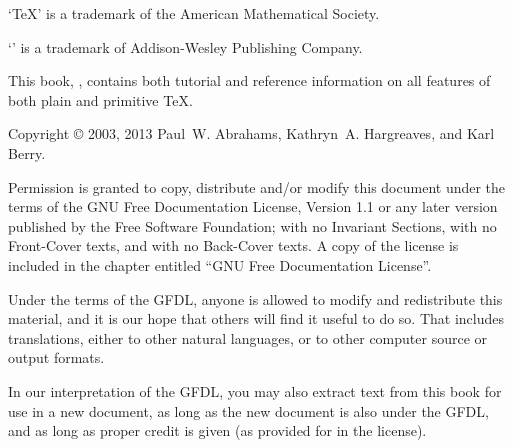 



% 
\noheadlinetrue
\sinkage

\noindent `\TeX' is a trademark of the American Mathematical Society.

\noindent `\Metafont' is a trademark of Addison-Wesley Publishing Company.

\bigskip
\noindent This book, \thisbook, contains both tutorial and reference
information on all features of both plain and primitive \TeX.

\bigskip

\noindent Copyright \copyright{} 2003, 2013 Paul~W. Abrahams,
Kathryn~A. Hargreaves, and Karl Berry.

\bigskip
\noindent Permission is granted to copy, distribute and/or modify this
document under the terms of the GNU Free Documentation License, Version
1.1 or any later version published by the Free Software Foundation; with
no Invariant Sections, with no Front-Cover texts, and with no Back-Cover
texts.  A copy of the license is included in the chapter entitled ``GNU
Free Documentation License''.

\medskip\noindent
Under the terms of the GFDL, anyone is allowed to modify and
redistribute this material, and it is our hope that others will find it
useful to do so.  That includes translations, either to other natural
languages, or to other computer source or output formats.

\medskip\noindent
In our interpretation of the GFDL, you may also extract text from this
book for use in a new document, as long as the new document is also
under the GFDL, and as long as proper credit is given (as provided for
in the license).


\pagebreak
\byebye
